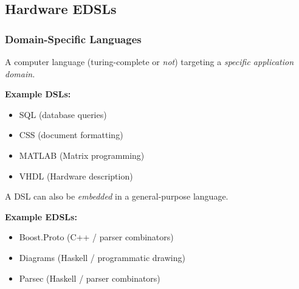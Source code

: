     \subsection{Hardware EDSLs}
    \label{subsec:hardware-edsls}
        \begin{frame}
            \frametitle{Domain-Specific Languages}

            \par{A computer language (turing-complete or \emph{not}) targeting a \emph{specific application domain.}}
            \par{\textbf{Example DSLs:}}
            \begin{itemize}
                \item SQL (database queries)
                \item CSS (document formatting)
                \item MATLAB (Matrix programming)
                \item VHDL (Hardware description)
            \end{itemize}

            \pause

            \vspace{0.3cm}
            \par{A DSL can also be \emph{embedded} in a general-purpose language.}
            \par{\textbf{Example EDSLs:}}
            \begin{itemize}
                \item Boost.Proto (C++ / parser combinators)
                \item Diagrams (Haskell / programmatic drawing)
                \item Parsec (Haskell / parser combinators)
            \end{itemize}

        \end{frame}


